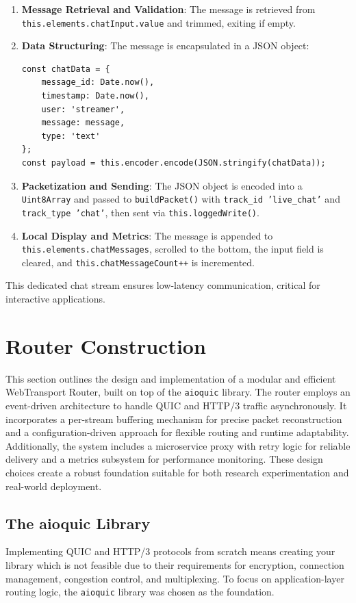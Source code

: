 \begin{enumerate}
    \item \textbf{Message Retrieval and Validation}: The message is retrieved from \texttt{this.elements\allowbreak{}.chatInput.value} and trimmed, exiting if empty.
    \item \textbf{Data Structuring}: The message is encapsulated in a JSON object:
    \begin{lstlisting}[breaklines=true,basicstyle=\small\ttfamily,frame=single]
const chatData = {
    message_id: Date.now(),
    timestamp: Date.now(),
    user: 'streamer',
    message: message,
    type: 'text'
};
const payload = this.encoder.encode(JSON.stringify(chatData));
    \end{lstlisting}
    \item \textbf{Packetization and Sending}: The JSON object is encoded into a \texttt{Uint8Array} and passed to \texttt{buildPacket()} with \texttt{track\_id 'live\_chat'} and \texttt{track\_type 'chat'}, then sent via \texttt{this.loggedWrite()}.
    \item \textbf{Local Display and Metrics}: The message is appended to \texttt{this.elements.chatMe\allowbreak{}ssages}, scrolled to the bottom, the input field is cleared, and \texttt{this.chatMessageCount++} is incremented.
\end{enumerate}

This dedicated chat stream ensures low-latency communication, critical for interactive applications.




\section{Router Construction}
This section outlines the design and implementation of a modular and efficient WebTransport Router, built on top of the \texttt{aioquic} library. The router employs an event-driven architecture to handle QUIC and HTTP/3 traffic asynchronously. It incorporates a per-stream buffering mechanism for precise packet reconstruction and a configuration-driven approach for flexible routing and runtime adaptability. Additionally, the system includes a microservice proxy with retry logic for reliable delivery and a metrics subsystem for performance monitoring. These design choices create a robust foundation suitable for both research experimentation and real-world deployment.

\subsection{The aioquic Library}
Implementing QUIC and HTTP/3 protocols from scratch means creating your library which is not feasible due to their requirements for encryption, connection management, congestion control, and multiplexing. To focus on application-layer routing logic, the \texttt{aioquic} library was chosen as the foundation.

